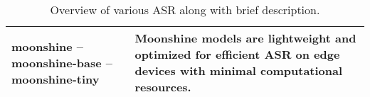 \begin{table*}[h!]
\begin{tabular}{p{}p{}}
\textbf{moonshine} \newline 
-- moonshine-base \newline 
-- moonshine-tiny & 
Moonshine models are lightweight and optimized for efficient ASR on edge devices with minimal computational resources. \\ \bottomrule

\end{tabular}
\caption{Overview of various ASR along with brief description.}

\label{tab:list_of_models}
\end{table*}
